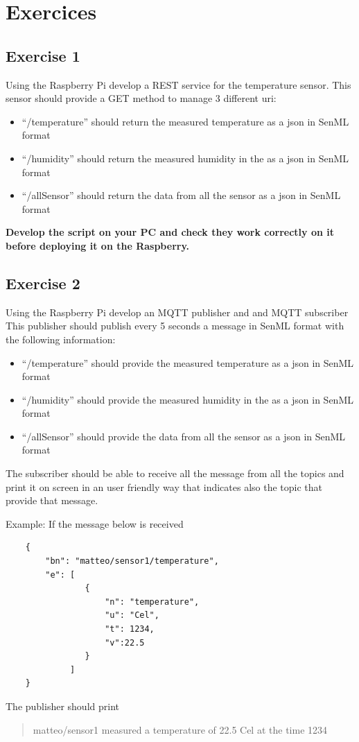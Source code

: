 \documentclass[a4paper]{article}
\begin{document}
\section{Exercices}
\label{sec:org9ca27ab}

\subsection{Exercise 1}
\label{sec:orgf6cd999}

Using the Raspberry Pi develop a REST service for the temperature sensor.
This sensor should provide a GET method to manage 3 different uri:

\begin{itemize}
\item ``/temperature'' should return the measured temperature as a json in SenML
format
\item ``/humidity'' should return the measured humidity in the as a json in SenML
format
\item ``/allSensor'' should return the data from all the sensor as a json in SenML
format
\end{itemize}

\textbf{Develop the script on your PC and check they work correctly on it before
deploying it on the Raspberry.}

\subsection{Exercise 2}
\label{sec:orgd05adad}

Using the Raspberry Pi develop an MQTT publisher and and MQTT subscriber
This publisher should publish every 5 seconds a message in SenML format with the
following information:

\begin{itemize}
\item ``/temperature'' should provide the measured temperature as a json in SenML
format
\item ``/humidity'' should provide the measured humidity in the as a json in SenML
format
\item ``/allSensor'' should provide the data from all the sensor as a json in SenML
format
\end{itemize}


The subscriber should be able to receive all the message from all the topics and
print it on screen in an user friendly way that indicates also the topic that
provide that message.

Example:
If the message below is received
\begin{verbatim}
    {
        "bn": "matteo/sensor1/temperature", 
        "e": [
                {
                    "n": "temperature", 
                    "u": "Cel", 
                    "t": 1234, 
                    "v":22.5 
                } 
             ]
    }
\end{verbatim}
The publisher should print
\begin{quote}
matteo/sensor1 measured a temperature of 22.5 Cel at the time 1234
\end{quote}
\end{document}
